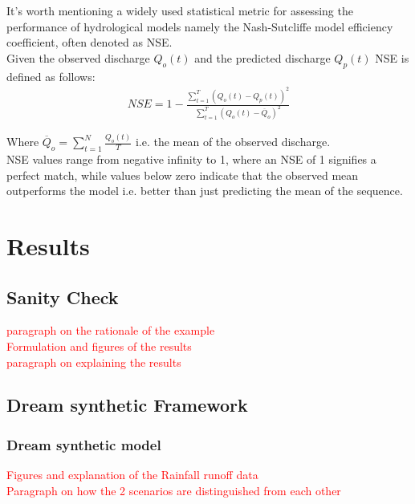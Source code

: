 \documentclass[12pt]{report}
\begin{document}
It's worth mentioning a widely used statistical metric for assessing the performance of hydrological models namely the Nash-Sutcliffe model efficiency coefficient, often denoted as NSE.\\

Given the observed discharge $Q_o(t)$ and the predicted discharge $Q_p(t)$ NSE is defined as follows:\\
\begin{align*}
	NSE = 1- \frac{\sum_{t=1}^T (Q_o(t)- Q_p(t))^2}{\sum_{t=1}^T(Q_o(t)- \overline{Q}_o)^2} 
\end{align*}

Where $\overline{Q}_o = \sum_{t=1}^N \frac{Q_o(t)}{T}$ i.e. the mean of the observed discharge.\\
 
NSE values range from negative infinity to 1, where an NSE of 1 signifies a perfect match, while values below zero indicate that the observed mean outperforms the model i.e. better than just predicting the mean of the sequence.
\newpage


\chapter{Results} 
 
\section{Sanity Check}
\textcolor{red}{paragraph on the rationale of the example}\\

\textcolor{red}{Formulation and figures of the results}\\

\textcolor{red}{paragraph on explaining the results}\\
\newpage
\section{Dream synthetic Framework}
\subsection{Dream synthetic model}
\textcolor{red}{Figures and explanation of the Rainfall runoff data}\\

\textcolor{red}{Paragraph on how the 2 scenarios are distinguished from each other }\\
\end{document}
